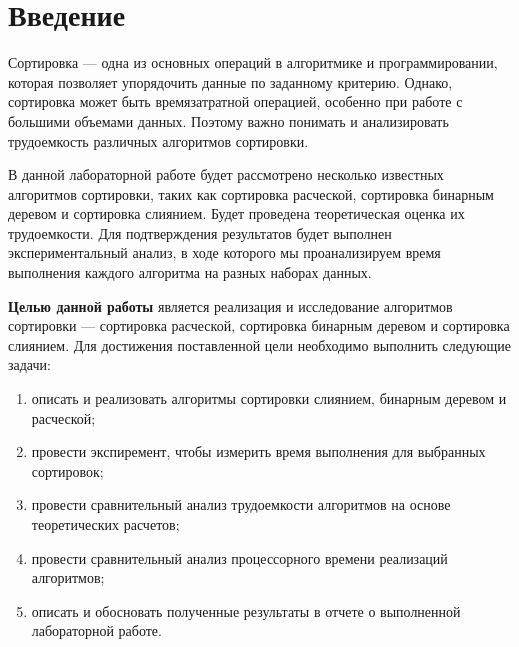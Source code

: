 \chapter*{Введение}

Сортировка --- одна из основных операций в алгоритмике и программировании, которая позволяет упорядочить данные по заданному критерию. Однако, сортировка может быть времязатратной операцией, особенно при работе с большими объемами данных. Поэтому важно понимать и анализировать трудоемкость различных алгоритмов сортировки.

В данной лабораторной работе будет рассмотрено несколько известных алгоритмов сортировки, таких как сортировка расческой, сортировка бинарным деревом и сортировка слиянием. Будет проведена теоретическая оценка их трудоемкости. Для подтверждения результатов будет выполнен экспериментальный анализ, в ходе которого мы проанализируем время выполнения каждого алгоритма на разных наборах данных.


\textbf{Целью данной работы} является реализация и исследование алгоритмов сортировки --- сортировка расческой, сортировка бинарным деревом и сортировка слиянием.
Для достижения поставленной цели необходимо выполнить следующие задачи:
\begin{enumerate}[label=\arabic*)]
	\item описать и реализовать алгоритмы сортировки слиянием, бинарным деревом и расческой;
    \item провести экспиремент, чтобы измерить время выполнения для выбранных сортировок;
    \item провести сравнительный анализ трудоемкости алгоритмов на основе теоретических расчетов;
    \item провести сравнительный анализ процессорного времени реализаций алгоритмов;
	\item описать и обосновать полученные результаты в отчете о выполненной лабораторной работе.
\end{enumerate}